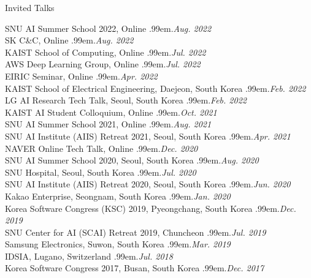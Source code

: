 \documentclass{resume} %
\makeatletter
\newcommand \Dotfill {\leavevmode \cleaders \hb@xt@ .99em{\hss .\hss }\hfill \kern \z@}
\makeatother
\begin{document}
\begin{rSection}{Invited Talks}

SNU AI Summer School 2022, Online \smallskip \Dotfill \emph{Aug. 2022} \\ 
SK C\&C, Online \smallskip \Dotfill \emph{Aug. 2022} \\ 
KAIST School of Computing, Online \smallskip \Dotfill \emph{Jul. 2022} \\ 
AWS Deep Learning Group, Online \smallskip \Dotfill \emph{Jul. 2022} \\ 
EIRIC Seminar, Online \smallskip \Dotfill \emph{Apr. 2022} \\ 
KAIST School of Electrical Engineering, Daejeon, South Korea \smallskip \Dotfill \emph{Feb. 2022} \\ 
LG AI Research Tech Talk, Seoul, South Korea \smallskip \Dotfill \emph{Feb. 2022} \\ 
KAIST AI Student Colloquium, Online \smallskip \Dotfill \emph{Oct. 2021} \\ 
SNU AI Summer School 2021, Online \smallskip \Dotfill \emph{Aug. 2021} \\ 
SNU AI Institute (AIIS) Retreat 2021, Seoul, South Korea \smallskip \Dotfill \emph{Apr. 2021} \\ 
NAVER Online Tech Talk, Online \smallskip \Dotfill \emph{Dec. 2020} \\ 
SNU AI Summer School 2020, Seoul, South Korea \smallskip \Dotfill \emph{Aug. 2020} \\ 
SNU Hospital, Seoul, South Korea \smallskip \Dotfill \emph{Jul. 2020} \\ 
SNU AI Institute (AIIS) Retreat 2020, Seoul, South Korea \smallskip \Dotfill \emph{Jun. 2020}\\ 
Kakao Enterprise, Seongnam, South Korea \smallskip \Dotfill \emph{Jan. 2020} \\ 
Korea Software Congress (KSC) 2019, Pyeongchang, South Korea \smallskip \Dotfill \emph{Dec. 2019} \\ 
SNU Center for AI (SCAI) Retreat 2019, Chuncheon \smallskip \Dotfill \emph{Jul. 2019} \\ 
Samsung Electronics, Suwon, South Korea \smallskip \Dotfill \emph{Mar. 2019} \\ 
IDSIA, Lugano, Switzerland \smallskip \Dotfill \emph{Jul. 2018} \\ 
Korea Software Congress 2017, Busan, South Korea \smallskip \Dotfill \emph{Dec. 2017}

\end{rSection}
\end{document}
